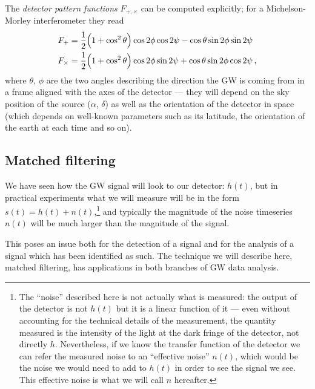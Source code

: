 \documentclass[main.tex]{subfiles}
\begin{document}
The \emph{detector pattern functions} \(F_{+, \times }\) can be computed explicitly; for a Michelson-Morley interferometer they read 
%
\begin{align}
F_{+} &= \frac{1}{2} \qty(1 + \cos^2 \theta ) \cos 2 \phi \cos 2 \psi - \cos \theta \sin 2 \phi \sin 2 \psi   \\
F_{ \times } &= \frac{1}{2} \qty(1 + \cos^2 \theta ) \cos 2 \phi \sin 2 \psi + \cos \theta \sin 2 \phi \cos 2 \psi  
\,,
\end{align}
%
where \(\theta \), \(\phi \) are the two angles describing the direction the \ac{GW} is coming from in a frame aligned with the axes of the detector --- they will depend on the sky position of the source (\(\alpha \), \(\delta \)) as well as the orientation of the detector in space (which depends on well-known parameters such as its latitude, the orientation of the earth at each time and so on).

\subsection{Matched filtering}

We have seen how the \ac{GW} signal will look to our detector: \(h(t)\), but in practical experiments what we will measure will be in the form \(s(t) = h(t) + n(t)\),\footnote{The ``noise'' described here is not actually what is measured: the output of the detector is not \(h(t)\) but it is a linear function of it --- even without accounting for the technical details of the measurement, the quantity measured is the intensity of the light at the dark fringe of the detector, not directly \(h\). Nevertheless, if we know the transfer function of the detector we can refer the measured noise to an ``effective noise'' \(n(t)\), which would be the noise we would need to add to \(h(t)\) in order to see the signal we see. This effective noise is what we will call \(n\) hereafter.} and typically the magnitude of the noise timeseries \(n(t)\) will be much larger than the magnitude of the signal. 

This poses an issue both for the detection of a signal and for the analysis of a signal which has been identified as such. 
The technique we will describe here, matched filtering, has applications in both branches of \ac{GW} data analysis.
\end{document}
